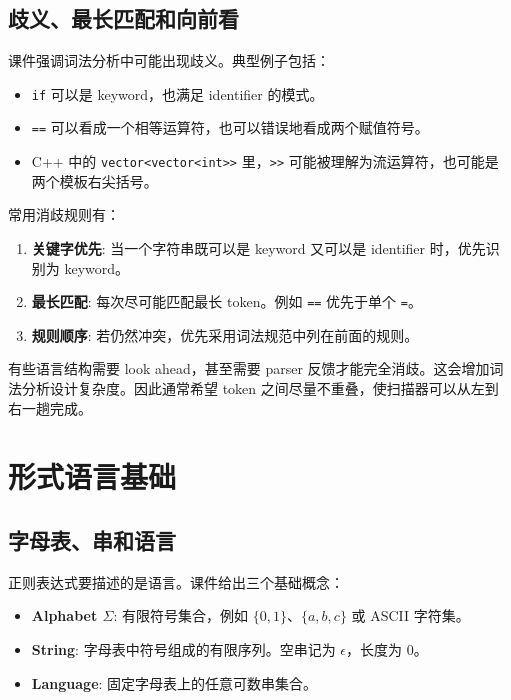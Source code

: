 \documentclass[11pt,a4paper]{article}
\newcommand{\code}[1]{\texttt{#1}}
\begin{document}
\subsection{歧义、最长匹配和向前看}

课件强调词法分析中可能出现歧义。典型例子包括：

\begin{itemize}
  \item \code{if} 可以是 keyword，也满足 identifier 的模式。
  \item \code{==} 可以看成一个相等运算符，也可以错误地看成两个赋值符号。
  \item C++ 中的 \code{vector<vector<int>>} 里，\code{>>} 可能被理解为流运算符，也可能是两个模板右尖括号。
\end{itemize}

常用消歧规则有：

\begin{enumerate}
  \item \textbf{关键字优先}: 当一个字符串既可以是 keyword 又可以是 identifier 时，优先识别为 keyword。
  \item \textbf{最长匹配}: 每次尽可能匹配最长 token。例如 \code{==} 优先于单个 \code{=}。
  \item \textbf{规则顺序}: 若仍然冲突，优先采用词法规范中列在前面的规则。
\end{enumerate}

有些语言结构需要 look ahead，甚至需要 parser 反馈才能完全消歧。这会增加词法分析设计复杂度。因此通常希望 token 之间尽量不重叠，使扫描器可以从左到右一趟完成。

\section{形式语言基础}

\subsection{字母表、串和语言}

正则表达式要描述的是语言。课件给出三个基础概念：

\begin{itemize}
  \item \textbf{Alphabet $\Sigma$}: 有限符号集合，例如 $\{0,1\}$、$\{a,b,c\}$ 或 ASCII 字符集。
  \item \textbf{String}: 字母表中符号组成的有限序列。空串记为 $\epsilon$，长度为 $0$。
  \item \textbf{Language}: 固定字母表上的任意可数串集合。
\end{itemize}
\end{document}
